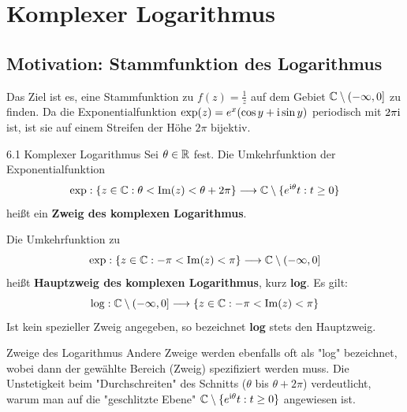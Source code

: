\section{Komplexer Logarithmus}

\subsection*{Motivation: Stammfunktion des Logarithmus}
Das Ziel ist es, eine Stammfunktion zu $f(z) = \frac{1}{z}$ auf dem Gebiet $\mathbb{C} \setminus (-\infty, 0]$ zu finden. Da die Exponentialfunktion $\exp(z) = e^x(\cos y + \mathrm{i} \sin y)$ periodisch mit $2\pi\mathrm{i}$ ist, ist sie auf einem Streifen der Höhe $2\pi$ bijektiv.

\begin{defi}{6.1 Komplexer Logarithmus}
Sei $\theta \in \mathbb{R}$ fest. Die Umkehrfunktion der Exponentialfunktion
\[
    \exp: \{z \in \mathbb{C} : \theta < \operatorname{Im}(z) < \theta + 2\pi\} \longrightarrow \mathbb{C} \setminus \{e^{\mathrm{i} \theta}t : t \ge 0\}
\]
heißt ein \textbf{Zweig des komplexen Logarithmus}.
\end{defi}

\begin{tcolorbox}[colback=white, colframe=black!70, title={Der Hauptzweig}]
Die Umkehrfunktion zu 
\[
    \exp: \{z \in \mathbb{C} : -\pi < \operatorname{Im}(z) < \pi\} \longrightarrow \mathbb{C} \setminus (-\infty, 0]
\]
heißt \textbf{Hauptzweig des komplexen Logarithmus}, kurz \textbf{log}.
Es gilt:
\[
    \log: \mathbb{C} \setminus (-\infty, 0] \longrightarrow \{z \in \mathbb{C} : -\pi < \operatorname{Im}(z) < \pi\}
\]
Ist kein spezieller Zweig angegeben, so bezeichnet \textbf{log} stets den Hauptzweig.
\end{tcolorbox}

\begin{warnung}{Zweige des Logarithmus}
Andere Zweige werden ebenfalls oft als "log" bezeichnet, wobei dann der gewählte Bereich (Zweig) spezifiziert werden muss. Die Unstetigkeit beim "Durchschreiten" des Schnitts ($\theta$ bis $\theta + 2\pi$) verdeutlicht, warum man auf die "geschlitzte Ebene" $\mathbb{C} \setminus \{e^{\mathrm{i} \theta}t : t \ge 0\}$ angewiesen ist.
\end{warnung}

